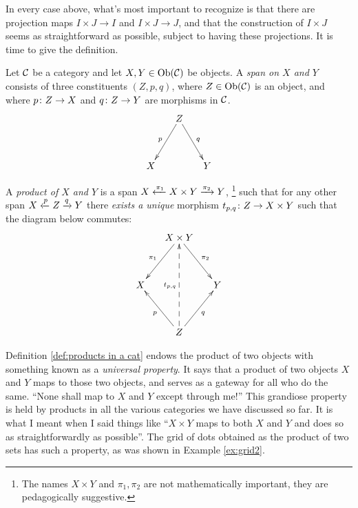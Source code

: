\documentclass[CT4S-EN-RU]{subfiles}
\begin{document}
\begin{exerciseRUS}
\end{exerciseRUS}

\begin{blockENG}
In every case above, what's most important to recognize is that there are projection maps $I\times J\to I$ and $I\times J\to J$, and that the construction of $I\times J$ seems as straightforward as possible, subject to having these projections. It is time to give the definition.
\end{blockENG}

\begin{blockRUS}
\end{blockRUS}

\begin{definitionENG}\label{def:products in a cat}
Let $\mathcal{C}$ be a category and let $X,Y\in\textnormal{Ob}(\mathcal{C})$ be objects. A {\em span on $X$ and $Y$} consists of three constituents $(Z,p,q)$, where $Z\in\textnormal{Ob}(\mathcal{C})$ is an object, and where $p\colon Z\rightarrow X$ and $q\colon Z\rightarrow Y$ are morphisms in $\mathcal{C}$. 
$$\xymatrix@=15pt{&Z\ar[ldd]_p\ar[rdd]^q\\\\X&&Y}$$   

A {\em product of $X$ and $Y$} is a span $X\xleftarrow{\pi_1}X\times Y\xrightarrow{\pi_2}Y$, \footnote{The names $X\times Y$ and $\pi_1,\pi_2$ are not mathematically important, they are pedagogically suggestive.} such that for any other span $X\xleftarrow{p}Z\xrightarrow{q}Y$ there {\em exists a unique} morphism $t_{p,q}\colon Z\rightarrow X\times Y$ such that the diagram below commutes:
$$
\xymatrix@=15pt{&X\times Y\ar[ldd]_{\pi_1}\ar[rdd]^{\pi_2}\\\\X&&Y\\\\&Z\ar[uul]^{p}\ar[uur]_q\ar@{-->}[uuuu]^{t_{p,q}}}
$$
\end{definitionENG}

\begin{definitionRUS}\label{def:products in a cat}
\end{definitionRUS}

\begin{remarkENG}\label{rem:gateway}
Definition \ref{def:products in a cat} endows the product of two objects with something known as a {\em universal property}. It says that a product of two objects $X$ and $Y$ maps to those two objects, and serves as a gateway for all who do the same. “None shall map to $X$ and $Y$ except through me!” This grandiose property is held by  products in all the various categories we have discussed so far. It is what I meant when I said things like “$X\times Y$ maps to both $X$ and $Y$ and does so as straightforwardly as possible”.  The grid of dots obtained as the product of two sets has such a property, as was shown in Example \ref{ex:grid2}.
\end{remarkENG}
\end{document}
